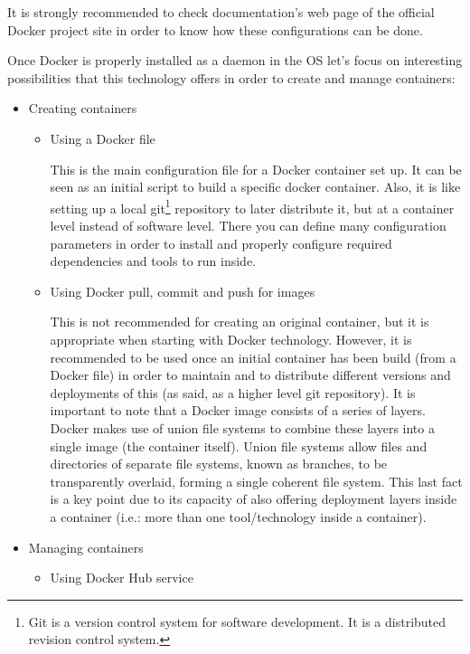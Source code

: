 It is strongly recommended to check documentation's web page of the official Docker project site \cite{docker} in order to know how these configurations can be done.

Once Docker is properly installed as a daemon in the OS let's focus on interesting possibilities that this technology offers in order to create and manage containers:

\begin{itemize}
\item Creating containers
	\begin{itemize}
	\item Using a Docker file \hfill
	
	This is the main configuration file for a Docker container set up. It can be seen as an initial script to build a specific docker container. Also, it is like setting up a local git\footnote{Git is a version control system for software development. It is a distributed revision control system.} repository to later distribute it, but at a container level instead of software level. There you can define many configuration parameters in order to install and properly configure required dependencies and tools to run inside. 	
	
	\item Using Docker pull, commit and push for images

	This is not recommended for creating an original container, but it is appropriate when starting with Docker technology. However, it is recommended to be used once an initial container has been build (from a Docker file) in order to maintain and to distribute different versions and deployments of this (as said, as a higher level git repository).	 
It is important to note that a Docker image consists of a series of layers. Docker makes use of union file systems to combine these layers into a single image (the container itself). Union file systems allow files and directories of separate file systems, known as branches, to be transparently overlaid, forming a single coherent file system. This last fact is a key point due to its capacity of also offering deployment layers inside a container (i.e.: more than one tool/technology inside a container).
	
	\end{itemize}
\item Managing containers 
	\begin{itemize}
	\item Using Docker Hub service


\end{itemize}
\end{itemize}
